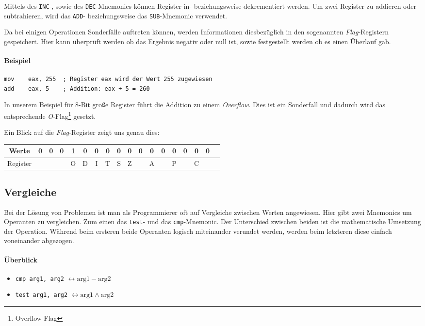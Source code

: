 Mittels des \texttt{INC}-, sowie des \texttt{DEC}-Mnemonics können Register in- beziehungsweise dekrementiert werden. Um zwei Register zu addieren oder subtrahieren, wird das \texttt{ADD}- beziehungsweise das \texttt{SUB}-Mnemonic verwendet.

Da bei einigen Operationen Sonderfälle auftreten können, werden Informationen diesbezüglich in den sogenannten \textit{Flag}-Registern gespeichert.
Hier kann überprüft werden ob das Ergebnis negativ oder null ist, sowie festgestellt werden ob es einen Überlauf gab.

\paragraph{Beispiel\newline}\makebox{}

\begin{lstlisting}
mov    eax, 255  ; Register eax wird der Wert 255 zugewiesen
add    eax, 5    ; Addition: eax + 5 = 260 
\end{lstlisting}

In unserem Beispiel für 8-Bit große Register führt die Addition zu einem \textit{Overflow}.
Dies ist ein Sonderfall und dadurch wird das entsprechende \textit{O}-Flag\footnote{Overflow Flag} gesetzt.

Ein Blick auf die \textit{Flag}-Register zeigt uns genau dies:

\begin{tabular}{|c|c|c|c|c|c|c|c|c|c|c|c|c|c|c|c|c|c|}
\hline Werte & 0 & 0 & 0 & 1 & 0 & 0 & 0 & 0 & 0 & 0 & 0 & 0 & 0 & 0 & 0 & 0 \\
\hline Register & & & & O & D & I & T & S & Z & & A & & P & & C & \\
\hline
\end{tabular}

\subsection{Vergleiche}
Bei der Lösung von Problemen ist man als Programmierer oft auf Vergleiche zwischen Werten angewiesen.
Hier gibt zwei Mnemonics um Operanten zu vergleichen. Zum einen das \texttt{test}- und das \texttt{cmp}-Mnemonic.
Der Unterschied zwischen beiden ist die mathematische Umsetzung der Operation. Während beim ersteren beide Operanten logisch miteinander verundet werden, werden beim letzteren diese einfach voneinander abgezogen. 

\paragraph{Überblick}
\begin{itemize}
	\item \texttt{cmp arg1, arg2} $\leftrightarrow \text{arg1} - \text{arg2}$

	\item \texttt{test arg1, arg2} $\leftrightarrow \text{arg1} \wedge \text{arg2}$
\end{itemize}

